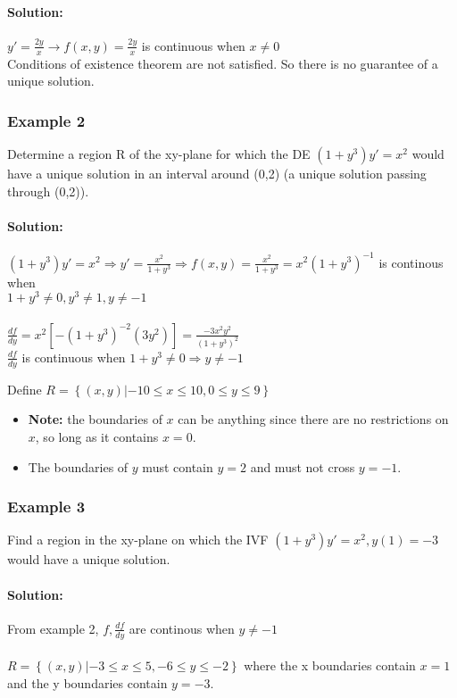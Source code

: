 \documentclass{article}
\begin{document}
\paragraph{Solution:} $y'=\frac{2y}{x}\rightarrow f(x,y)=\frac{2y}{x}$ is continuous when $x\ne0$
\\Conditions of existence theorem are not satisfied. So there is no guarantee of a unique solution.

\subsubsection{Example 2}
Determine a region R of the xy-plane for which the DE $\left(1+y^3\right)y'=x^2$ would have a unique solution in an interval around (0,2) (a unique solution passing through (0,2)).

\paragraph{Solution:} $(1+y^3)y'=x^2\Rightarrow y'=\frac{x^2}{1+y^3}\Rightarrow f(x,y)=\frac{x^2}{1+y^3}=x^2(1+y^3)^{-1}$ is continous when\\$1+y^3\ne0, y^3\ne1, y\ne-1$
\\\\$\frac{df}{dy}=x^2\left[ -(1+y^3)^{-2}(3y^2) \right] =\frac{-3x^2y^2}{(1+y^3)^2}$
\\$\frac{df}{dy}$ is continuous when $1+y^3\ne0\Rightarrow y\ne-1$

Define $R=\left\{(x,y)|-10\leq x \leq 10, 0\leq y \leq 9\right\}$
\begin{itemize}
    \item \textbf{Note: } the boundaries of $x$ can be anything since there are no restrictions on $x$, so long as it contains $x=0$.
    \item The boundaries of $y$ must contain $y=2$ and must not cross $y=-1$.
\end{itemize}
\newpage
\subsubsection{Example 3}
Find a region in the xy-plane on which the IVF $(1+y^3)y'=x^2, y(1)=-3$ would have a unique solution.

\paragraph{Solution:}
From example 2, $f,\frac{df}{dy}$ are continous when $y\ne-1$
\\\\$R=\left\{(x,y)|-3\leq x\leq 5, -6\leq y\leq -2\right\}$ where the x boundaries contain $x=1$ and the y boundaries contain $y=-3$.
\end{document}
